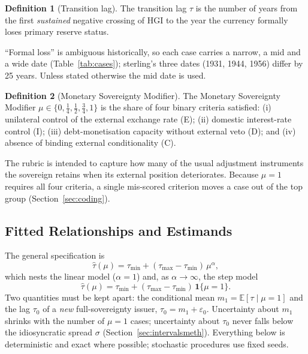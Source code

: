 \documentclass[11pt,letterpaper]{article}
\theoremstyle{definition}
\newtheorem{definition}{Definition}[section]
\theoremstyle{plain}
\newcommand{\HGI}{\mathrm{HGI}}
\begin{document}
\begin{definition}[Transition lag]\label{def:lag}
The transition lag $\tau$ is the number of years from the first \emph{sustained} negative crossing of $\HGI$ to the year the currency formally loses primary reserve status.
\end{definition}

``Formal loss'' is ambiguous historically, so each case carries a narrow, a mid and a wide date (Table~\ref{tab:cases}); sterling's three dates (1931, 1944, 1956) differ by 25 years. Unless stated otherwise the mid date is used.

\begin{definition}[Monetary Sovereignty Modifier]\label{def:mu}
The Monetary Sovereignty Modifier $\mu\in\{0,\tfrac14,\tfrac12,\tfrac34,1\}$ is the share of four binary criteria satisfied: (i) unilateral control of the external exchange rate (E); (ii) domestic interest-rate control (I); (iii) debt-monetisation capacity without external veto (D); and (iv) absence of binding external conditionality (C).
\end{definition}

The rubric is intended to capture how many of the usual adjustment instruments the sovereign retains when its external position deteriorates. Because $\mu=1$ requires all four criteria, a single mis-scored criterion moves a case out of the top group (Section~\ref{sec:coding}).

\subsection{Fitted Relationships and Estimands}\label{sec:fitted}
The general specification is
\begin{equation}
\hat\tau(\mu)=\tau_{\min}+(\tau_{\max}-\tau_{\min})\,\mu^{\alpha}, \label{eq:curve}
\end{equation}
which nests the linear model ($\alpha=1$) and, as $\alpha\to\infty$, the step model
\begin{equation}
\hat\tau(\mu)=\tau_{\min}+(\tau_{\max}-\tau_{\min})\,\mathbf 1\{\mu=1\}. \label{eq:step}
\end{equation}
Two quantities must be kept apart: the conditional mean $m_1=\mathbb E[\tau\mid\mu=1]$ and the lag $\tau_0$ of a \emph{new} full-sovereignty issuer, $\tau_0=m_1+\varepsilon_0$. Uncertainty about $m_1$ shrinks with the number of $\mu=1$ cases; uncertainty about $\tau_0$ never falls below the idiosyncratic spread $\sigma$ (Section~\ref{sec:intervalsmeth}). Everything below is deterministic and exact where possible; stochastic procedures use fixed seeds.
\end{document}
